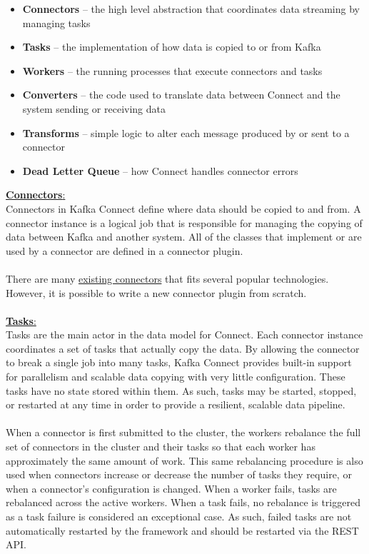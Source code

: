 \documentclass[10pt,a4paper]{article}
\newcommand{\nline}{\\~\\}
\begin{document}
\begin{itemize}
	\item \textbf{Connectors} – the high level abstraction that coordinates data streaming by managing tasks
	\item \textbf{Tasks} – the implementation of how data is copied to or from Kafka
	\item \textbf{Workers} – the running processes that execute connectors and tasks
	\item \textbf{Converters} – the code used to translate data between Connect and the system sending or receiving data
	\item \textbf{Transforms} – simple logic to alter each message produced by or sent to a connector
	\item \textbf{Dead Letter Queue} – how Connect handles connector errors
\end{itemize}
\uline{\textbf{Connectors}:} \\
Connectors in Kafka Connect define where data should be copied to and from. A connector instance is a logical job that is responsible for managing the copying of data between Kafka and another system. All of the classes that implement or are used by a connector are defined in a connector plugin.
\nline
There are many \href{http://www.confluent.io/product/connectors/}{existing connectors} that fits several popular technologies. However, it is possible to write a new connector plugin from scratch.
\nline
\uline{\textbf{Tasks}:} \\
Tasks are the main actor in the data model for Connect. Each connector instance coordinates a set of tasks that actually copy the data. By allowing the connector to break a single job into many tasks, Kafka Connect provides built-in support for parallelism and scalable data copying with very little configuration. These tasks have no state stored within them. As such, tasks may be started, stopped, or restarted at any time in order to provide a resilient, scalable data pipeline.
\nline
When a connector is first submitted to the cluster, the workers rebalance the full set of connectors in the cluster and their tasks so that each worker has approximately the same amount of work. This same rebalancing procedure is also used when connectors increase or decrease the number of tasks they require, or when a connector’s configuration is changed. When a worker fails, tasks are rebalanced across the active workers. When a task fails, no rebalance is triggered as a task failure is considered an exceptional case. As such, failed tasks are not automatically restarted by the framework and should be restarted via the REST API.
\end{document}
